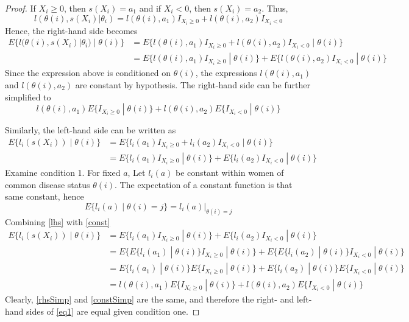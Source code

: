 \documentclass[letterpaper, 12pt]{article}\usepackage[]{graphicx}\usepackage[]{color}
\newcommand{\sbs}{\;|\;} %
\begin{document}
\begin{proof}
If $X_i \geq 0$, then $s(X_i) = a_1$ and if $X_i < 0$, then $s(X_i)=a_2$. Thus,
\[
l(\theta(i), s(X_i)|\theta_i) = l(\theta(i), a_1) I_{X_i \geq 0} + l(\theta(i), a_2) I_{X_i < 0}
\]
Hence, the right-hand side becomes
\begin{align}
E\{l(\theta(i), s(X_i)|\theta_i) \sbs \theta(i)\} 
&= 
E\{l(\theta(i), a_1) I_{X_i \geq 0} + l(\theta(i), a_2) I_{X_i < 0} \sbs \theta(i)\}
\\
&=
E\{l(\theta(i), a_1) I_{X_i \geq 0} \sbs \theta(i)\} +
E\{l(\theta(i), a_2) I_{X_i < 0} \sbs \theta(i)\}
\end{align}
Since the expression above is conditioned on $\theta(i)$, the expressions $l(\theta(i), a_1)$ and $l(\theta(i), a_2)$ are constant by hypothesis. The right-hand side can be further simplified to
\begin{equation}
l(\theta(i), a_1)E\{I_{X_i \geq 0} \sbs \theta(i)\} +
l(\theta(i), a_2)E\{ I_{X_i < 0} \sbs \theta(i)\}
\label{rhsSimp}
\end{equation}

Similarly, the left-hand side can be written as
\begin{align}
E\{l_i(s(X_i)) \sbs \theta(i)\} &=
E\{l_i(a_1)I_{X_i \geq 0} + l_i(a_2) I_{X_i < 0} \sbs \theta(i)\}
\\
&=
E\{l_i(a_1)I_{X_i \geq 0} \sbs \theta(i)\}
 + E\{l_i(a_2) I_{X_i < 0} \sbs \theta(i)\}
\label{lhs}
\end{align}
Examine condition 1. For fixed $a$, Let $l_i(a)$ be constant within women of common disease status $\theta(i)$. The expectation of a constant function is that same constant, hence 
\begin{equation}
E\{l_i(a) \sbs \theta(i)=j\} = l_i(a) |_{\theta(i)=j}
\label{const}
\end{equation}
Combining \eqref{lhs} with \eqref{const}
\begin{align}
E\{l_i(s(X_i)) \sbs \theta(i)\} &=
E\{l_i(a_1)I_{X_i \geq 0} \sbs \theta(i)\}
 + E\{l_i(a_2) I_{X_i < 0} \sbs \theta(i)\}
\\
&=
E\{E\{l_i(a_1) \sbs \theta(i)\}I_{X_i \geq 0} \sbs \theta(i)\}
 + 
E\{E\{l_i(a_2) \sbs \theta(i)\}I_{X_i < 0} \sbs \theta(i)\}
\\
&=
E\{l_i(a_1) \sbs \theta(i)\} E\{I_{X_i \geq 0} \sbs \theta(i)\}
+
E\{l_i(a_2) \sbs \theta(i)\} E\{I_{X_i < 0} \sbs \theta(i)\}
\\
&=
l(\theta(i), a_1)E\{I_{X_i \geq 0} \sbs \theta(i)\}
+
l(\theta(i), a_2)E\{I_{X_i < 0} \sbs \theta(i)\}
\label{constSimp}
\end{align}
Clearly, \eqref{rhsSimp} and \eqref{constSimp} are the same, and therefore the right- and left-hand sides of \eqref{eq1} are equal given condition one.


\end{proof}
\end{document}
